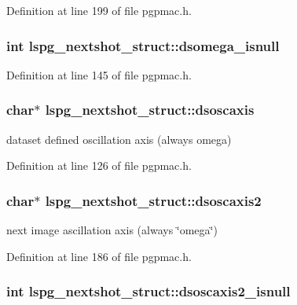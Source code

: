 Definition at line 199 of file pgpmac.h.\hypertarget{structlspg__nextshot__struct_ad1da3548dc642d415aed53dc165c44fc}{
\subsubsection[{dsomega\_\-isnull}]{\setlength{\rightskip}{0pt plus 5cm}int {\bf lspg\_\-nextshot\_\-struct::dsomega\_\-isnull}}}
\label{structlspg__nextshot__struct_ad1da3548dc642d415aed53dc165c44fc}


Definition at line 145 of file pgpmac.h.\hypertarget{structlspg__nextshot__struct_a9a62c304e66013e8e5e5618a44f0b6d4}{
\subsubsection[{dsoscaxis}]{\setlength{\rightskip}{0pt plus 5cm}char$\ast$ {\bf lspg\_\-nextshot\_\-struct::dsoscaxis}}}
\label{structlspg__nextshot__struct_a9a62c304e66013e8e5e5618a44f0b6d4}


dataset defined oscillation axis (always omega) 

Definition at line 126 of file pgpmac.h.\hypertarget{structlspg__nextshot__struct_ac86005a6e90ff502da9e95b59d0b7a5f}{
\subsubsection[{dsoscaxis2}]{\setlength{\rightskip}{0pt plus 5cm}char$\ast$ {\bf lspg\_\-nextshot\_\-struct::dsoscaxis2}}}
\label{structlspg__nextshot__struct_ac86005a6e90ff502da9e95b59d0b7a5f}


next image ascillation axis (always \char`\"{}omega\char`\"{}) 

Definition at line 186 of file pgpmac.h.\hypertarget{structlspg__nextshot__struct_a98e280e99ae847559bb82836df3c32d1}{
\subsubsection[{dsoscaxis2\_\-isnull}]{\setlength{\rightskip}{0pt plus 5cm}int {\bf lspg\_\-nextshot\_\-struct::dsoscaxis2\_\-isnull}}}
\label{structlspg__nextshot__struct_a98e280e99ae847559bb82836df3c32d1}


